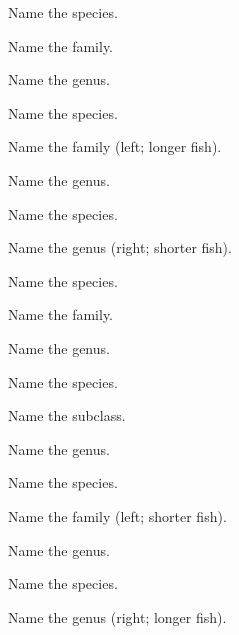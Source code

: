 \documentclass{exam}
\begin{document}
\begin{questions}
{\question 
Name the species.
\vspace{2\baselineskip}

\question 
Name the family.
\vspace{0.5\baselineskip}

\question 
Name the genus.
\vspace{0.5\baselineskip}

\question 
Name the species.
\vspace{2\baselineskip}

\question 
Name the family (left; longer fish).
\vspace{0.5\baselineskip}

\question 
Name the genus.
\vspace{0.5\baselineskip}

\question 
Name the species.
\vspace{0.5\baselineskip}

\question 
Name the genus (right; shorter fish).
\vspace{0.5\baselineskip}

\question 
Name the species.
\vspace{2\baselineskip}

\question 
Name the family.
\vspace{0.5\baselineskip}

\question 
Name the genus.
\vspace{0.5\baselineskip}

\question Name the species.
\vspace{2\baselineskip}
\newpage

\question 
Name the subclass.
\vspace{0.5\baselineskip}

\question 
Name the genus.
\vspace{0.5\baselineskip}

\question 
Name the species.
\vspace{2\baselineskip}

\question 
Name the family (left; shorter fish).
\vspace{0.5\baselineskip}

\question 
Name the genus.
\vspace{0.5\baselineskip}

\question 
Name the species.
\vspace{0.5\baselineskip}

\question 
Name the genus (right; longer fish).
\vspace{0.5\baselineskip}

}
\end{questions}
\end{document}
